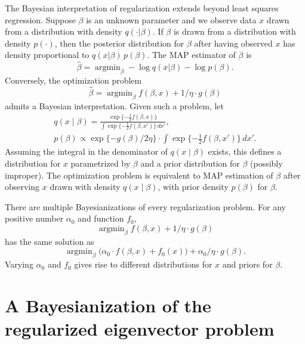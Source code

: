 \documentclass[11pt]{article}
\DeclareMathOperator*{\argmin}{argmin}
\begin{document}
The Bayesian interpretation of regularization extends beyond least squares
regression.  Suppose $\beta$ is an unknown parameter and we observe data $x$ drawn
from a distribution with density $q(\cdot | \beta)$.  If $\beta$ is
drawn from a distribution with density $p(\cdot)$, then the posterior distribution
for $\beta$ after having observed $x$ has density proportional
to $q(x | \beta) \, p(\beta)$.  The MAP estimator of $\beta$ is
\[
    \hat \beta
        =
        \argmin_\beta
            -
            \log q(x | \beta)
            -
            \log p(\beta).
\]
Conversely, the optimization problem
\[
    \hat \beta
        =
        \argmin_\beta
            f(\beta, x)
            +
            1/\eta
            \cdot
            g(\beta)
\]
admits a Bayesian interpretation.  Given such a problem, let
\begin{gather*}
    q(x \mid \beta)
        =
        \frac{\exp\{ -\tfrac{1}{2} f(\beta, x) \}}
             {\int \exp\{ -\tfrac{1}{2} f(\beta, x') \} \, dx'}, \\
    p(\beta)
        \propto
            \exp\{-g(\beta)/2 \eta\}
            \cdot
            \int \exp\{ -\tfrac{1}{2} f(\beta, x') \} \, dx'.
\end{gather*}
Assuming the integral in the denominator of $q(x \mid \beta)$ exists, this
defines a distribution for $x$ parametrized by $\beta$ and a prior distribution for
$\beta$ (possibly improper).  The optimization problem is equivalent to MAP
estimation of $\beta$ after observing $x$ drawn with density $q(x\mid\beta)$, with
prior density $p(\beta)$ for $\beta$.

There are multiple Bayesianizations of every regularization problem.  For any
positive number $\alpha_0$ and function $f_0$,
\[
    \argmin_\beta
        f(\beta, x)
        +
        1/\eta
        \cdot
        g(\beta)
\]
has the same solution as
\[
    \argmin_\beta
        \big(\alpha_0 \cdot f(\beta, x) + f_0(x)\big)
        +
        \alpha_0/\eta \cdot g(\beta).
\]
Varying $\alpha_0$ and $f_0$ gives rise to different distributions for $x$ and
priors for $\beta$.


\section{A Bayesianization of the regularized eigenvector problem}
\end{document}
